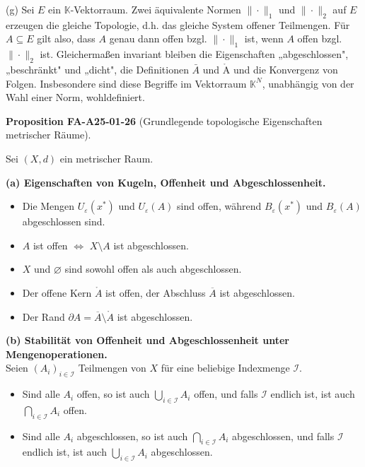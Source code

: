 \documentclass[10pt, letterpaper]{article}
\newcommand{\CustomHeading}[3]{%
  \par\medskip\noindent%
  \textbf{#1 #2} \textnormal{(#3)}.\enskip%
}
\newenvironment{PROP}[2]{\begin{unitbox}\CustomHeading{Proposition}{#1}{#2}}{\end{unitbox}}
\def\AA{\mathring{\mathrm{A}}}
\begin{document}
(g) Sei $E$ ein $\mathbb{K}$-Vektorraum. Zwei äquivalente Normen $\|\cdot\|_{1}$ und $\|\cdot\|_{2}$ auf $E$ erzeugen die gleiche Topologie, d.h. das gleiche System offener Teilmengen. Für $A \subseteq E$ gilt also, dass $A$ genau dann offen bzgl. $\|\cdot\|_{1}$ ist, wenn $A$ offen bzgl. $\|\cdot\|_{2}$ ist. Gleichermaßen invariant bleiben die Eigenschaften „abgeschlossen", „beschränkt" und „dicht", die Definitionen $\bar{A}$ und $\AA$ und die Konvergenz von Folgen. Insbesondere sind diese Begriffe im Vektorraum $\mathbb{K}^{N}$, unabhängig von der Wahl einer Norm, wohldefiniert.\\



\begin{PROP}{FA-A25-01-26}{Grundlegende topologische Eigenschaften metrischer Räume}
Sei $(X,d)$ ein metrischer Raum.

\textbf{(a) Eigenschaften von Kugeln, Offenheit und Abgeschlossenheit.}
\begin{itemize}
  \item Die Mengen $U_{\varepsilon}(x^{*})$ und $U_{\varepsilon}(A)$ sind offen, während $B_{\varepsilon}(x^{*})$ und $B_{\varepsilon}(A)$ abgeschlossen sind.
  \item $A$ ist offen $\Longleftrightarrow$ $X\setminus A$ ist abgeschlossen.
  \item $X$ und $\varnothing$ sind sowohl offen als auch abgeschlossen.
  \item Der offene Kern $\mathring{A}$ ist offen, der Abschluss $\overline{A}$ ist abgeschlossen.
  \item Der Rand $\partial A=\overline{A}\setminus \mathring{A}$ ist abgeschlossen.
\end{itemize}

\textbf{(b) Stabilität von Offenheit und Abgeschlossenheit unter Mengenoperationen.}\\
Seien $(A_i)_{i\in\mathcal{I}}$ Teilmengen von $X$ für eine beliebige Indexmenge $\mathcal{I}$.
\begin{itemize}
  \item Sind alle $A_i$ offen, so ist auch $\bigcup_{i\in\mathcal{I}}A_i$ offen, und falls $\mathcal{I}$ endlich ist, ist auch $\bigcap_{i\in\mathcal{I}}A_i$ offen.
  \item Sind alle $A_i$ abgeschlossen, so ist auch $\bigcap_{i\in\mathcal{I}}A_i$ abgeschlossen, und falls $\mathcal{I}$ endlich ist, ist auch $\bigcup_{i\in\mathcal{I}}A_i$ abgeschlossen.
\end{itemize}


\end{PROP}
\end{document}
